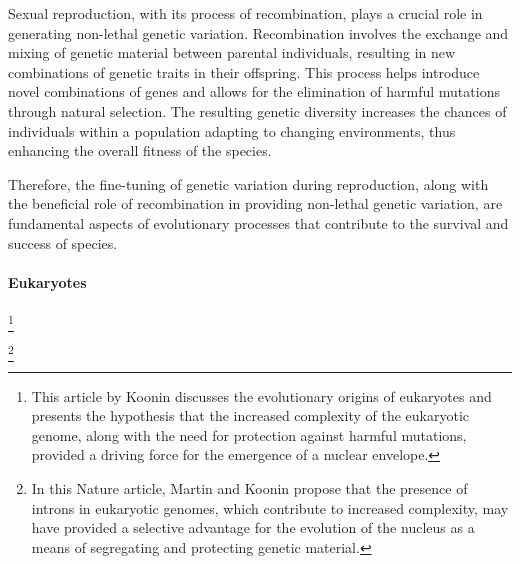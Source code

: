 Sexual reproduction, with its process of recombination, plays a crucial role in generating non-lethal genetic variation. Recombination involves the exchange and mixing of genetic material between parental individuals, resulting in new combinations of genetic traits in their offspring. This process helps introduce novel combinations of genes and allows for the elimination of harmful mutations through natural selection. The resulting genetic diversity increases the chances of individuals within a population adapting to changing environments, thus enhancing the overall fitness of the species.

Therefore, the fine-tuning of genetic variation during reproduction, along with the beneficial role of recombination in providing non-lethal genetic variation, are fundamental aspects of evolutionary processes that contribute to the survival and success of species.


\paragraph{Eukaryotes}

\cite{koonin2010origin}\footnote{This article by Koonin discusses the evolutionary origins of eukaryotes and presents the hypothesis that the increased complexity of the eukaryotic genome, along with the need for protection against harmful mutations, provided a driving force for the emergence of a nuclear envelope.
}

\cite{martin2006introns}\footnote{In this Nature article, Martin and Koonin propose that the presence of introns in eukaryotic genomes, which contribute to increased complexity, may have provided a selective advantage for the evolution of the nucleus as a means of segregating and protecting genetic material.
}


